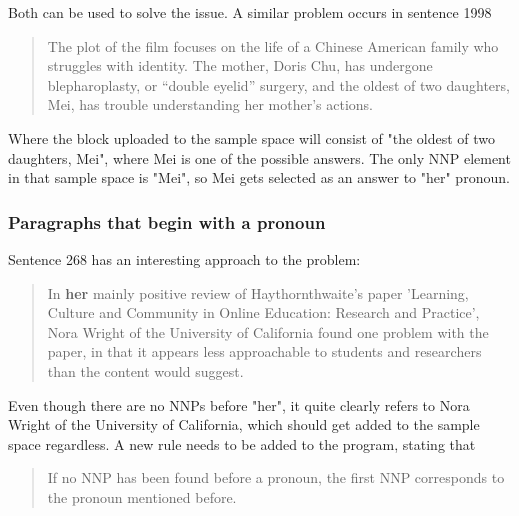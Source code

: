 \documentclass{article}
\begin{document}
Both can be used to solve the issue. A similar problem occurs in sentence 1998
\begin{quote}
    The plot of the film focuses on the life of a Chinese American family who struggles with identity. The mother, Doris Chu, has undergone blepharoplasty, or ``double eyelid'' surgery, and the oldest of two daughters, Mei, has trouble understanding her mother's actions.
\end{quote}
Where the block uploaded to the sample space will consist of "the oldest of two daughters, Mei", where Mei is one of the possible answers. The only NNP element in that sample space is "Mei", so Mei gets selected as an answer to "her" pronoun.

\subsubsection{Paragraphs that begin with a pronoun}
Sentence 268 has an interesting approach to the problem:
\begin{quote}
    In \textbf{her} mainly positive review of Haythornthwaite's paper 'Learning, Culture and Community in Online Education: Research and Practice', Nora Wright of the University of California found one problem with the paper, in that it appears less approachable to students and researchers than the content would suggest.
\end{quote}
Even though there are no NNPs before "her", it quite clearly refers to Nora Wright of the University of California, which should get added to the sample space regardless. A new rule needs to be added to the program, stating that
\begin{quote}
    If no NNP has been found before a pronoun, the first NNP corresponds to the pronoun mentioned before.
\end{quote}
\end{document}
